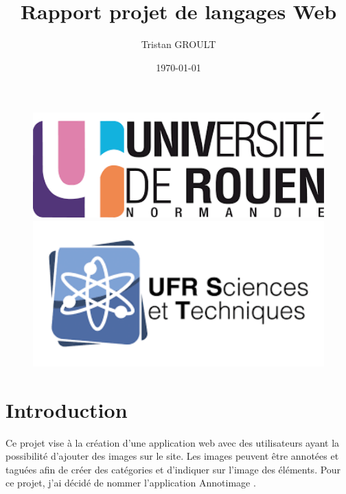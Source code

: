 \documentclass[a4paper, 12pt]{article}
\title{Rapport projet de langages Web}
\author{Tristan GROULT}
\date{\today}
\begin{document}
\begin{figure}[t]
    \centering
    \begin{minipage}{0.3\textwidth}
        \centering
        \includegraphics[width=1\textwidth]{logo_univ.png}
    \end{minipage}
    \hfill
    \begin{minipage}{0.3\textwidth}
        \centering
        \includegraphics[width=1\textwidth]{ufr_logo.png}
    \end{minipage}
\end{figure}

\maketitle

\clearpage\setcounter{page}{2}

{
\hypersetup{hidelinks} %
\renewcommand{\contentsname}{Sommaire}
\tableofcontents %
}

\clearpage

\section{Introduction}

Ce projet vise à la création d'une application web avec des utilisateurs ayant la possibilité d'ajouter des images sur le site. Les images peuvent être annotées et taguées afin de créer des catégories et d'indiquer sur l'image des éléments. Pour ce projet, j'ai décidé de nommer l'application \og Annotimage \fg.
\end{document}
